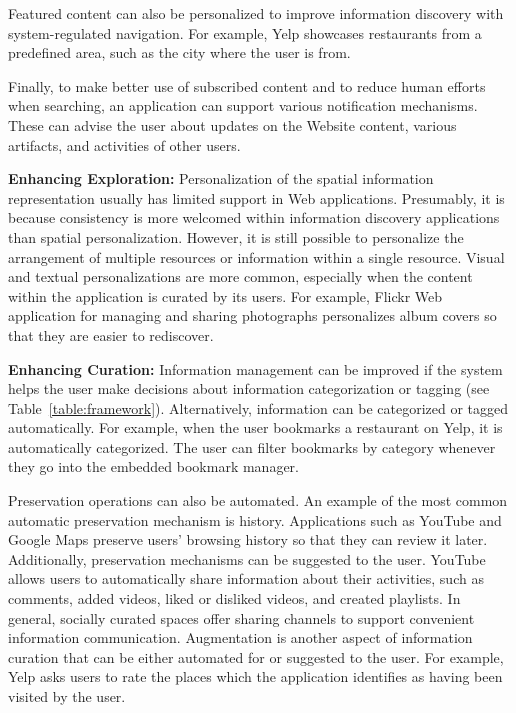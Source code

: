 \documentclass{sigchi}
\newcommand{\feature}[1]{{\ttfamily#1}}
\begin{document}
{{{Featured content can also be \feature{personalized} to improve information discovery with system-regulated navigation. For example, Yelp showcases restaurants from a predefined area, such as the city where the user is from.

Finally, to make better use of subscribed content and to reduce human efforts when searching, an application can support various \feature{notification mechanisms}. These can advise the user about updates on the \feature{Website content}, various \feature{artifacts}, and activities of other \feature{users}.  

} %
{\textbf{Enhancing Exploration:}
\feature{Personalization} of the \feature{spatial} information representation usually has limited support in Web applications. Presumably, it is because consistency is more welcomed within information discovery applications than spatial personalization. However, it is still possible to personalize the arrangement of multiple resources or information within a single resource. 
%
\feature{Visual} and \feature{textual personalizations} are more common, especially when the content within the application is curated by its users.  For example, Flickr Web application for managing and sharing photographs personalizes album covers so that they are easier to rediscover. 


{\textbf{Enhancing Curation:}
Information management can be improved if the system helps the user make decisions about information categorization or tagging (see Table~\ref{table:framework}). Alternatively, information can be \feature{categorized} or \feature{tagged automatically}. For example, when the user bookmarks a restaurant on Yelp, it is automatically categorized. The user can filter bookmarks by category whenever they go into the embedded bookmark manager. 

Preservation operations can also be automated. An example of the most common automatic preservation mechanism is \feature{history}. Applications such as YouTube and Google Maps preserve users' browsing history so that they can review it later. Additionally, preservation mechanisms can be \feature{suggested} to the user.
% 
YouTube allows users to \feature{automatically share} information about their activities, such as comments,  added videos, liked or disliked videos, and created playlists. In general, socially curated spaces offer \feature{sharing channels} to support convenient information communication.
%
Augmentation is another aspect of information curation that can be either \feature{automated} for or \feature{suggested} to the user. For example, Yelp asks users to rate the places which the application identifies as having been visited by the user. 

}}}}
\end{document}
